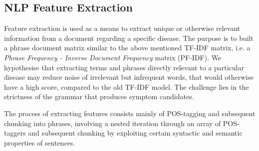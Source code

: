 \documentclass[10pt,letterpaper,two column,final]{article}
\begin{document}



\subsection{NLP Feature Extraction}
\label{chap:nlpmodel}
Feature extraction is used as a means to extract unique or otherwise
relevant information from a document regarding a specific disease. The
purpose is to built a phrase document matrix similar to the above
mentioned TF-IDF matrix, i.e. a \textit{Phrase Frequency - Inverse
Document Frequency} matrix (PF-IDF). We hypothesise that extracting
terms and phrases directly relevant to a particular disease may reduce
noise of irrelevant but infrequent words, that would otherwise have a
high score, compared to the old TF-IDF model. The challenge lies in the
strictness of the grammar that produces symptom candidates.

The process of extracting features consists mainly of POS-tagging and
subsequent chunking into phrases, involving a nested iteration through
an array of POS-taggers and subsequent chunking by exploiting certain
syntactic and semantic properties of sentences.
\end{document}
